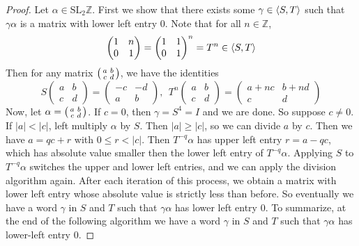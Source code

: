 \documentclass[12pt,twoside]{reedthesis}
\theoremstyle{definition}
\newcommand{\Z}{\mathbb{Z}}
\newcommand{\SLZ}{\mathrm{SL}_2{\Z}}
\DeclarePairedDelimiter\ang{\langle}{\rangle}
\begin{document}
\begin{proof}
  Let $\alpha \in \SLZ$.
  First we show that there exists some $\gamma \in \ang{S,T}$ such that $\gamma\alpha$ is a matrix with lower left entry 0.
  Note that for all $n \in \Z$,
  \begin{equation*}
    \begin{pmatrix}
      1 & n \\
      0 & 1
    \end{pmatrix}
    = \begin{pmatrix}
      1 & 1 \\
      0 & 1
    \end{pmatrix}^n
    = T^n \in \ang{S,T}
  \end{equation*}
  Then for any matrix $\begin{psmallmatrix}a & b \\ c & d\end{psmallmatrix}$, we have the identities
  \begin{equation*}
    S \begin{pmatrix}
      a & b \\
      c & d
    \end{pmatrix}
    = \begin{pmatrix}
      -c & -d \\
      a & b
    \end{pmatrix},\ \
    T^n \begin{pmatrix}
      a & b \\
      c & d
    \end{pmatrix}
    = \begin{pmatrix}
      a + nc & b + nd \\
      c & d
    \end{pmatrix}
  \end{equation*}
  Now, let $\alpha = \begin{psmallmatrix}a & b \\ c & d\end{psmallmatrix}$.
  If $c = 0$, then $\gamma = S^4 = I$ and we are done.
  So suppose $c \neq 0$.
  If $|a| < |c|$, left multiply $\alpha$ by $S$.
  Then $|a| \geq |c|$, so we can divide $a$ by $c$.
  Then we have $a = qc + r$ with $0 \leq r < |c|$.
  Then $T^{-q} \alpha$ has upper left entry $r = a - qc$, which has absolute value smaller then the lower left entry of $T^{-q} \alpha$.
  Applying $S$ to $T^{-q} \alpha$ switches the upper and lower left entries, and we can apply the division algorithm again.
  After each iteration of this process, we obtain a matrix with lower left entry whose absolute value is strictly less than before.
  So eventually we have a word $\gamma$ in $S$ and $T$ such that $\gamma\alpha$ has lower left entry 0.
  To summarize, at the end of the following algorithm we have a word $\gamma$ in $S$ and $T$ such that $\gamma \alpha$ has lower-left entry 0.
  

\end{proof}
\end{document}
